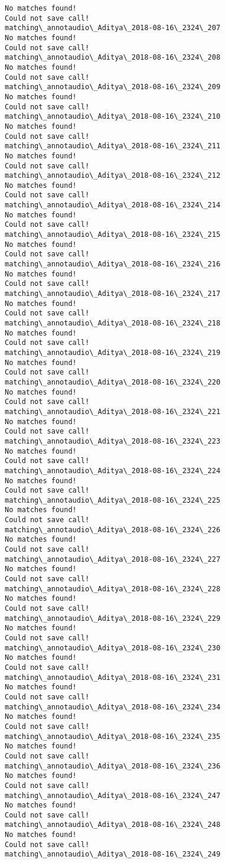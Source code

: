 \documentclass[11pt]{article}
\begin{document}
\begin{Verbatim}[commandchars=\\\{\}]
No matches found!
Could not save call!
matching\_annotaudio\_Aditya\_2018-08-16\_2324\_207
No matches found!
Could not save call!
matching\_annotaudio\_Aditya\_2018-08-16\_2324\_208
No matches found!
Could not save call!
matching\_annotaudio\_Aditya\_2018-08-16\_2324\_209
No matches found!
Could not save call!
matching\_annotaudio\_Aditya\_2018-08-16\_2324\_210
No matches found!
Could not save call!
matching\_annotaudio\_Aditya\_2018-08-16\_2324\_211
No matches found!
Could not save call!
matching\_annotaudio\_Aditya\_2018-08-16\_2324\_212
No matches found!
Could not save call!
matching\_annotaudio\_Aditya\_2018-08-16\_2324\_214
No matches found!
Could not save call!
matching\_annotaudio\_Aditya\_2018-08-16\_2324\_215
No matches found!
Could not save call!
matching\_annotaudio\_Aditya\_2018-08-16\_2324\_216
No matches found!
Could not save call!
matching\_annotaudio\_Aditya\_2018-08-16\_2324\_217
No matches found!
Could not save call!
matching\_annotaudio\_Aditya\_2018-08-16\_2324\_218
No matches found!
Could not save call!
matching\_annotaudio\_Aditya\_2018-08-16\_2324\_219
No matches found!
Could not save call!
matching\_annotaudio\_Aditya\_2018-08-16\_2324\_220
No matches found!
Could not save call!
matching\_annotaudio\_Aditya\_2018-08-16\_2324\_221
No matches found!
Could not save call!
matching\_annotaudio\_Aditya\_2018-08-16\_2324\_223
No matches found!
Could not save call!
matching\_annotaudio\_Aditya\_2018-08-16\_2324\_224
No matches found!
Could not save call!
matching\_annotaudio\_Aditya\_2018-08-16\_2324\_225
No matches found!
Could not save call!
matching\_annotaudio\_Aditya\_2018-08-16\_2324\_226
No matches found!
Could not save call!
matching\_annotaudio\_Aditya\_2018-08-16\_2324\_227
No matches found!
Could not save call!
matching\_annotaudio\_Aditya\_2018-08-16\_2324\_228
No matches found!
Could not save call!
matching\_annotaudio\_Aditya\_2018-08-16\_2324\_229
No matches found!
Could not save call!
matching\_annotaudio\_Aditya\_2018-08-16\_2324\_230
No matches found!
Could not save call!
matching\_annotaudio\_Aditya\_2018-08-16\_2324\_231
No matches found!
Could not save call!
matching\_annotaudio\_Aditya\_2018-08-16\_2324\_234
No matches found!
Could not save call!
matching\_annotaudio\_Aditya\_2018-08-16\_2324\_235
No matches found!
Could not save call!
matching\_annotaudio\_Aditya\_2018-08-16\_2324\_236
No matches found!
Could not save call!
matching\_annotaudio\_Aditya\_2018-08-16\_2324\_247
No matches found!
Could not save call!
matching\_annotaudio\_Aditya\_2018-08-16\_2324\_248
No matches found!
Could not save call!
matching\_annotaudio\_Aditya\_2018-08-16\_2324\_249

\end{Verbatim}
\end{document}
